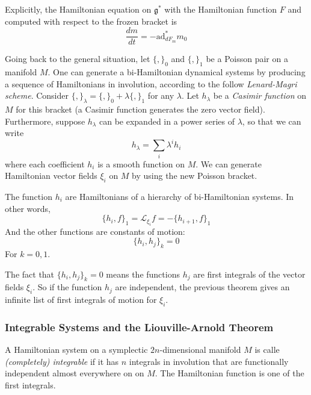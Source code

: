 \begin{rmk}

Explicitly, the Hamiltonian equation on $ \mathfrak{g}^*$ with the Hamiltonian function $F$ and computed with respect to the frozen bracket is 
\[
	\frac{dm}{dt}=- \mathrm{ad}^*_{dF_m} m_0
\]


\end{rmk}

\indent Going back to the general situation, let $ \{ , \}_0$ and $ \{ , \}_1$ be a Poisson pair on a manifold $M$. One can generate a bi-Hamiltonian dynamical systems by producing a sequence of Hamiltonians in involution, according to the follow \textit{Lenard-Magri scheme}. Consider $ \{ , \}_{\lambda} = \{ , \}_0 + \lambda \{ , \}_1$ for any $\lambda$. Let $h_{\lambda}$ be a \textit{Casimir function} on $M$ for this bracket (a Casimir function generates the zero vector field). Furthermore, suppose $h_{\lambda}$ can be expanded in a power series of $ \lambda$, so that we can write
\[
	h_{\lambda} = \sum_i \lambda^i h_i
\]
where each coefficient $h_i$ is a smooth function on $M$. We can generate Hamiltonian vector fields $\xi_i$ on $M$ by using the new Poisson bracket.



\begin{thm}

The function $h_i$ are Hamiltonians of a hierarchy of bi-Hamiltonian systems. In other words,
\[
	\{ h_i, f \}_1 = \mathcal{L}_{\xi_i} f = - \{ h_{i+1}, f \}_1
\]
And the other functions are constants of motion:
\[
\{ h_i, h_j \}_k = 0
\]
For $k=0,1$.

\end{thm}


\begin{rmk}

	The fact that $ \{ h_i, h_j \}_k =0$ means the functions $h_j$ are first integrals of the vector fields $\xi_i$. So if the function $h_j$ are independent, the previous theorem gives an infinite list of first integrals of motion for $\xi_i$.

\end{rmk}

\subsubsection{Integrable Systems and the Liouville-Arnold Theorem}

\begin{defn}

	A Hamiltonian system on a symplectic $2n$-dimensional manifold $M$ is calle \textit{(completely) integrable} if it has $n$ integrals in involution that are functionally independent almost everywhere on on $M$. The Hamiltonian function is one of the first integrals.

\end{defn}


